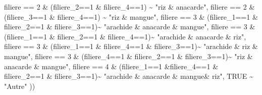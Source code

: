 \documentclass[
  letterpaper,
  DIV=11,
  numbers=noendperiod]{scrartcl}
\newenvironment{Shaded}{\begin{snugshade}}{\end{snugshade}}
\newcommand{\ConstantTok}[1]{\textcolor[rgb]{0.56,0.35,0.01}{#1}}
\newcommand{\DecValTok}[1]{\textcolor[rgb]{0.68,0.00,0.00}{#1}}
\newcommand{\NormalTok}[1]{\textcolor[rgb]{0.00,0.23,0.31}{#1}}
\newcommand{\SpecialCharTok}[1]{\textcolor[rgb]{0.37,0.37,0.37}{#1}}
\newcommand{\StringTok}[1]{\textcolor[rgb]{0.13,0.47,0.30}{#1}}
\begin{document}
\begin{Shaded}
\begin{Highlighting}[]
\NormalTok{                                      filiere }\SpecialCharTok{==} \DecValTok{2} \SpecialCharTok{\&}\NormalTok{ (filiere\_2}\SpecialCharTok{==}\DecValTok{1} \SpecialCharTok{\&}\NormalTok{ filiere\_4}\SpecialCharTok{==}\DecValTok{1}\NormalTok{) }\SpecialCharTok{\textasciitilde{}} \StringTok{"riz \& anacarde"}\NormalTok{,}
\NormalTok{                                      filiere }\SpecialCharTok{==} \DecValTok{2} \SpecialCharTok{\&}\NormalTok{ (filiere\_3}\SpecialCharTok{==}\DecValTok{1} \SpecialCharTok{\&}\NormalTok{ filiere\_4}\SpecialCharTok{==}\DecValTok{1}\NormalTok{) }\SpecialCharTok{\textasciitilde{}} \StringTok{"riz \& mangue"}\NormalTok{,}
\NormalTok{                                      filiere }\SpecialCharTok{==} \DecValTok{3} \SpecialCharTok{\&}\NormalTok{ (filiere\_1}\SpecialCharTok{==}\DecValTok{1} \SpecialCharTok{\&}\NormalTok{ filiere\_2}\SpecialCharTok{==}\DecValTok{1} \SpecialCharTok{\&}\NormalTok{ filiere\_3}\SpecialCharTok{==}\DecValTok{1}\NormalTok{)}\SpecialCharTok{\textasciitilde{}} \StringTok{"arachide \& anacarde \& mangue"}\NormalTok{,}
\NormalTok{                                      filiere }\SpecialCharTok{==} \DecValTok{3} \SpecialCharTok{\&}\NormalTok{ (filiere\_1}\SpecialCharTok{==}\DecValTok{1} \SpecialCharTok{\&}\NormalTok{ filiere\_2}\SpecialCharTok{==}\DecValTok{1} \SpecialCharTok{\&}\NormalTok{ filiere\_4}\SpecialCharTok{==}\DecValTok{1}\NormalTok{)}\SpecialCharTok{\textasciitilde{}} \StringTok{"arachide \& anacarde \& riz"}\NormalTok{,}
\NormalTok{                                      filiere }\SpecialCharTok{==} \DecValTok{3} \SpecialCharTok{\&}\NormalTok{ (filiere\_1}\SpecialCharTok{==}\DecValTok{1} \SpecialCharTok{\&}\NormalTok{ filiere\_4}\SpecialCharTok{==}\DecValTok{1} \SpecialCharTok{\&}\NormalTok{ filiere\_3}\SpecialCharTok{==}\DecValTok{1}\NormalTok{)}\SpecialCharTok{\textasciitilde{}} \StringTok{"arachide \& riz \& mangue"}\NormalTok{,}
\NormalTok{                                      filiere }\SpecialCharTok{==} \DecValTok{3} \SpecialCharTok{\&}\NormalTok{ (filiere\_4}\SpecialCharTok{==}\DecValTok{1} \SpecialCharTok{\&}\NormalTok{ filiere\_2}\SpecialCharTok{==}\DecValTok{1} \SpecialCharTok{\&}\NormalTok{ filiere\_3}\SpecialCharTok{==}\DecValTok{1}\NormalTok{)}\SpecialCharTok{\textasciitilde{}} \StringTok{"riz \& anacarde \& mangue"}\NormalTok{,}
\NormalTok{                                      filiere }\SpecialCharTok{==} \DecValTok{4} \SpecialCharTok{\&}\NormalTok{ (filiere\_1}\SpecialCharTok{==}\DecValTok{1} \SpecialCharTok{\&}\NormalTok{filiere\_4}\SpecialCharTok{==}\DecValTok{1} \SpecialCharTok{\&}\NormalTok{ filiere\_2}\SpecialCharTok{==}\DecValTok{1} \SpecialCharTok{\&}\NormalTok{ filiere\_3}\SpecialCharTok{==}\DecValTok{1}\NormalTok{)}\SpecialCharTok{\textasciitilde{}} \StringTok{"arachide \& anacarde \& mangue\& riz"}\NormalTok{,}
                                      \ConstantTok{TRUE} \SpecialCharTok{\textasciitilde{}} \StringTok{"Autre"}
\NormalTok{                                    ))}
\end{Highlighting}
\end{Shaded}
\end{document}
